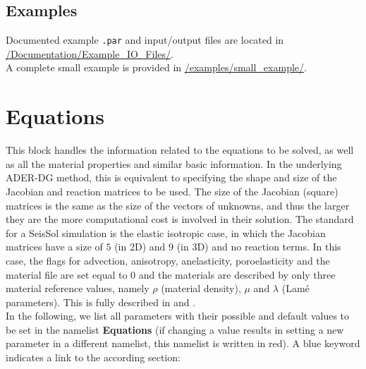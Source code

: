 \documentclass[12pt,twoside]{article}
\begin{document}
\subsection{Examples}

Documented example {\tt*.par} and input/output files are located in \url{/Documentation/Example_IO_Files/}.\\

\noindent A complete small example is provided in \url{/examples/small_example/}.


\section{Equations}
\label{sec-block-eqs}
This block handles the information related to the equations to be solved, 
as well as all the material properties and similar basic information. 
In the underlying ADER-DG method, 
this is equivalent to specifying the shape and size of the Jacobian and reaction matrices to be used.
The size of the Jacobian (square) matrices is the same as the size of the vectors of unknowns,
and thus the larger they are the more computational cost is involved in their solution. 
The standard for a SeisSol simulation is the elastic isotropic case, in which the Jacobian matrices have a size of $5$ (in 2D) 
and $9$ (in 3D) and no reaction terms. 
In this case, the flags for advection, anisotropy, anelasticity, poroelasticity 
and the material file are set equal to 0 and the materials are described by only three material reference values, 
namely $\rho$ (material density), $\mu$ and $\lambda$ (Lam{\' e} parameters). 
This is fully described in \cite{KaeserDumbser06} and \cite{DumbserKaeser06}.\\

In the following, we list all parameters with their possible and default values to be set in the namelist \textbf{Equations}
(if changing a value results in setting a new parameter in a different namelist, this namelist is written in red).
A blue keyword indicates a link to the according section:\\

\newpage
\end{document}
